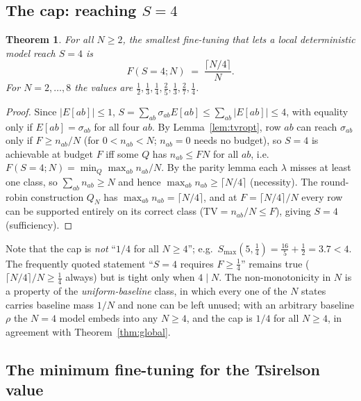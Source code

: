 \documentclass[aps,pra,reprint,superscriptaddress,floatfix]{revtex4-2}
\newcommand{\TV}{\mathrm{TV}}
\newtheorem{theorem}{Theorem}
\begin{document}
\subsection{The cap: reaching $S=4$}
\label{sec:cap}

\begin{theorem}
\label{thm:cap}
For all $N\ge2$, the smallest fine-tuning that lets a local deterministic
model reach $S=4$ is
\begin{equation}
F(S{=}4;N) \;=\; \frac{\lceil N/4\rceil}{N}.
\label{eq:cap}
\end{equation}
For $N=2,\dots,8$ the values are $\tfrac12,\tfrac13,\tfrac14,\tfrac25,\tfrac13,\tfrac27,\tfrac14$.
\end{theorem}

\begin{proof}
Since $|E[ab]|\le1$, $S=\sum_{ab}\sigma_{ab}E[ab]\le\sum_{ab}|E[ab]|\le4$,
with equality only if $E[ab]=\sigma_{ab}$ for all four $ab$. By Lemma~\ref{lem:tvropt}, row
$ab$ can reach $\sigma_{ab}$ only if $F\ge n_{ab}/N$ (for $0<n_{ab}<N$;
$n_{ab}=0$ needs no budget), so $S=4$ is achievable at budget $F$ iff some
$Q$ has $n_{ab}\le FN$ for all $ab$, i.e.\
$F(S{=}4;N)=\min_Q\max_{ab} n_{ab}/N$. By the parity lemma each $\lambda$
misses at least one class, so $\sum_{ab}n_{ab}\ge N$ and hence
$\max_{ab}n_{ab}\ge\lceil N/4\rceil$ (necessity). The round-robin
construction $Q_N$ has $\max_{ab}n_{ab}=\lceil N/4\rceil$, and at
$F=\lceil N/4\rceil/N$ every row can be supported entirely on its correct
class ($\TV=n_{ab}/N\le F$), giving $S=4$ (sufficiency).
\end{proof}

\noindent
Note that the cap is \emph{not} ``$1/4$ for all $N\ge4$''; e.g.\
$S_{\max}(5,\tfrac14)=\tfrac{16}{5}+\tfrac12=3.7<4$. The frequently quoted
statement ``$S=4$ requires $F\ge\tfrac14$'' remains true
($\lceil N/4\rceil/N\ge\tfrac14$ always) but is tight only when $4\mid N$.
The non-monotonicity in $N$ is a property of the \emph{uniform-baseline}
class, in which every one of the $N$ states carries baseline mass $1/N$ and
none can be left unused; with an arbitrary baseline $\rho$ the $N=4$ model
embeds into any $N\ge4$, and the cap is $1/4$ for all $N\ge4$, in agreement
with Theorem~\ref{thm:global}.

\subsection{The minimum fine-tuning for the Tsirelson value}
\label{sec:headline}
\end{document}
